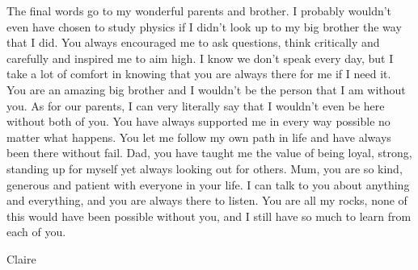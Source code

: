 The final words go to my wonderful parents and brother. I probably wouldn't even have chosen to study physics if I didn't look up to my big brother the way that I did. You always encouraged me to ask questions, think critically and carefully and inspired me to aim high. I know we don't speak every day, but I take a lot of comfort in knowing that you are always there for me if I need it. You are an amazing big brother and I wouldn't be the person that I am without you. As for our parents, I can very literally say that I wouldn't even be here without both of you. You have always supported me in every way possible no matter what happens. You let me follow my own path in life and have always been there without fail. Dad, you have taught me the value of being loyal, strong, standing up for myself yet always looking out for others. Mum, you are so kind, generous and patient with everyone in your life. I can talk to you about anything and everything, and you are always there to listen. You are all my rocks, none of this would have been possible without you, and I still have so much to learn from each of you.


\raggedleft
Claire




